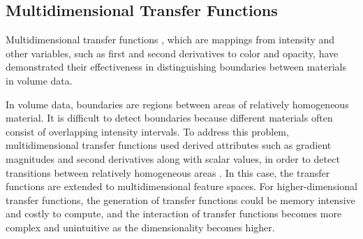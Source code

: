\subsection{Multidimensional Transfer Functions}
Multidimensional transfer functions \cite{kniss_interactive_2001}, which are mappings from intensity and other variables, such as first and second derivatives to color and opacity, have demonstrated their effectiveness in distinguishing boundaries between materials in volume data.


In volume data, boundaries are regions between areas of relatively homogeneous material. It is difficult to detect boundaries because different materials often consist of overlapping intensity intervals. To address this problem, multidimensional transfer functions used derived attributes such as gradient magnitudes and second derivatives along with scalar values, in order to detect transitions between relatively homogeneous areas \cite{kindlmann_semi-automatic_1998} \cite{kniss_multidimensional_2002} \cite{kindlmann_transfer_2002}.
In this case, the transfer functions are extended to multidimensional feature spaces.
For higher-dimensional transfer functions, the generation of transfer functions could be memory intensive and costly to compute,
and the interaction of transfer functions becomes more complex and unintuitive as the dimensionality becomes higher. 

